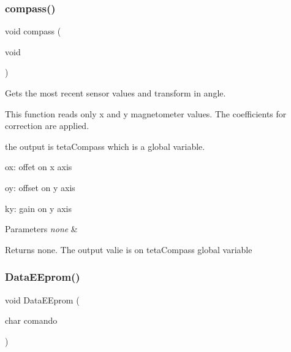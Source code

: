 \mbox{\label{ari_pi__2_d_c__esp__08_8ino_ada2502f03f6e1fe62fef80b03f317b98}} 
\subsubsection{\texorpdfstring{compass()}{compass()}}
{\footnotesize\ttfamily void compass (\begin{DoxyParamCaption}\item[{void}]{ }\end{DoxyParamCaption})}



Gets the most recent sensor values and transform in angle. 

This function reads only x and y magnetometer values. The coefficients for correction are applied.

the output is teta\+Compass which is a global variable.

ox\+: offet on x axis

oy\+: offset on y axis

ky\+: gain on y axis


\begin{DoxyParams}{Parameters}
{\em none} & \\
\hline
\end{DoxyParams}
\begin{DoxyReturn}{Returns}
none. The output valie is on teta\+Compass global variable 
\end{DoxyReturn}
\mbox{\label{ari_pi__2_d_c__esp__08_8ino_a24f4d37ce4673eadaa4043cf6ecaff27}} 
\subsubsection{\texorpdfstring{Data\+E\+Eprom()}{DataEEprom()}}
{\footnotesize\ttfamily void Data\+E\+Eprom (\begin{DoxyParamCaption}\item[{char}]{comando }\end{DoxyParamCaption})}



